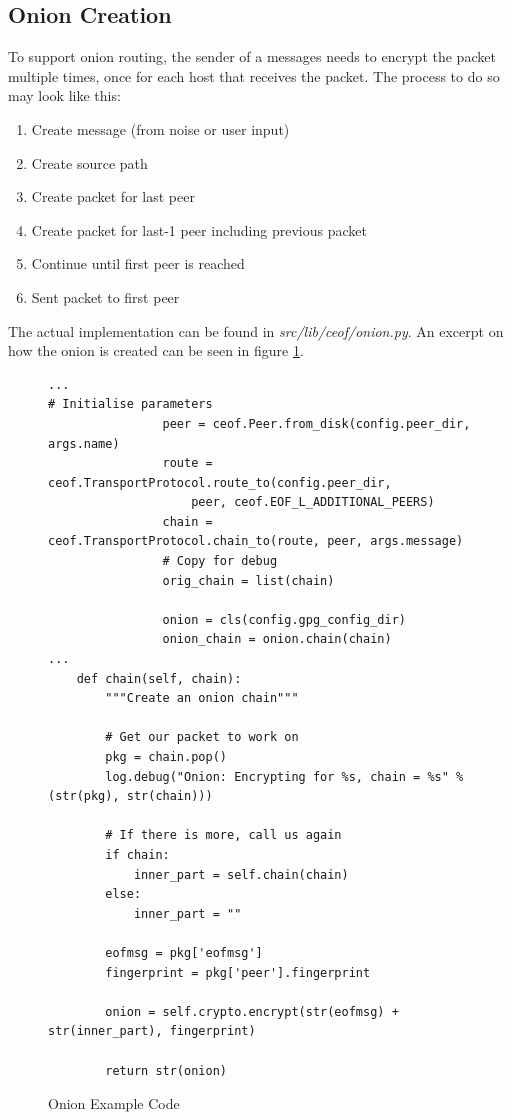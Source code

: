\subsection{Onion Creation}
To support onion routing, the sender of a messages needs to encrypt the packet
multiple times, once for each host that receives the packet. 
The process to do so may look like this:
\begin{enumerate}
\item Create message (from noise or user input)
\item Create source path
\item Create packet for last peer
\item Create packet for last-1 peer including previous packet
\item Continue until first peer is reached
\item Sent packet to first peer 
\end{enumerate}
The actual implementation can be found in \textit{src/lib/ceof/onion.py}.
An excerpt on how the onion is created can be seen in figure \ref{onionexample}.
\begin{figure}[htbp]
\caption{Onion Example Code}
\label{onionexample}
\begin{verbatim}
...
# Initialise parameters
                peer = ceof.Peer.from_disk(config.peer_dir, args.name)
                route = ceof.TransportProtocol.route_to(config.peer_dir, 
                    peer, ceof.EOF_L_ADDITIONAL_PEERS)
                chain = ceof.TransportProtocol.chain_to(route, peer, args.message)
                # Copy for debug
                orig_chain = list(chain)

                onion = cls(config.gpg_config_dir)
                onion_chain = onion.chain(chain)
...
    def chain(self, chain):
        """Create an onion chain"""

        # Get our packet to work on
        pkg = chain.pop()
        log.debug("Onion: Encrypting for %s, chain = %s" % (str(pkg), str(chain)))

        # If there is more, call us again
        if chain:
            inner_part = self.chain(chain)
        else:   
            inner_part = ""

        eofmsg = pkg['eofmsg']
        fingerprint = pkg['peer'].fingerprint

        onion = self.crypto.encrypt(str(eofmsg) + str(inner_part), fingerprint)

        return str(onion)
\end{verbatim}
\end{figure}
